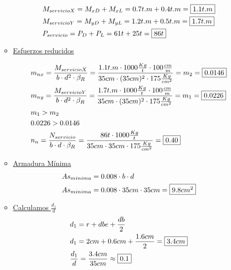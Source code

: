 \begin{enumerate}
\begin{itemize}
\begin{align*}
& M_{servicioX} = M_{xD} + M_{xL} = 0.7 t.m + 0.4 t.m = \framebox{$1.1t.m$}\\
& M_{servicioY} = M_{yD} + M_{yL} = 1.2 t.m + 0.5 t.m = \framebox{$1.7t.m$}\\
& P_{servicio} = P_D + P_L = 61 t + 25 t = \framebox{$86t$}
\end{align*}

\item \underline{Esfuerzos reducidos}

\begin{align*}
& m_{nx} = \frac{M_{servicioX}}{b \cdot d^2 \cdot \beta_R} = \frac{1.1t.m \cdot 1000\frac{Kg}{t} \cdot 100\frac{cm}{m}}{35cm \cdot (35cm)^2 \cdot 175 \frac{Kg}{cm^2}} = m_2 = \framebox{0.0146}\\
& m_{ny} = \frac{M_{servicioY}}{b \cdot d^2 \cdot \beta_R} = \frac{1.7t.m \cdot 1000\frac{Kg}{t} \cdot 100\frac{cm}{m}}{35cm \cdot (35cm)^2 \cdot 175 \frac{Kg}{cm^2}} = m_1 = \framebox{0.0226}\\
& m_1 > m_2\\
& 0.0226 > 0.0146 \\
& n_{n} = \frac{N_{servicio}}{b \cdot d \cdot \beta_R} = \frac{86t \cdot 1000\frac{Kg}{t}}{35cm \cdot 35cm\cdot 175 \frac{Kg}{cm^2}} = \framebox{0.40}
\end{align*}

\item \underline{Armadura Mínima}
\begin{align*}
& As_{minima} = 0.008 \cdot b \cdot d \\
& As_{minima} = 0.008 \cdot 35cm \cdot 35cm = \framebox{$9.8cm^2$}
\end{align*}

\item \underline{Calculamos $\frac{d_1}{d}$}
\begin{align*}
& d_1 = r + dbe + \frac{db}{2} \\
& d_1 = 2cm + 0.6cm + \frac{1.6cm}{2} = \framebox{$3.4cm$}\\
& \frac{d_1}{d} = \frac{3.4cm}{35cm} \approx \framebox{0.1} \\
\end{align*}


\end{itemize}
\end{enumerate}
